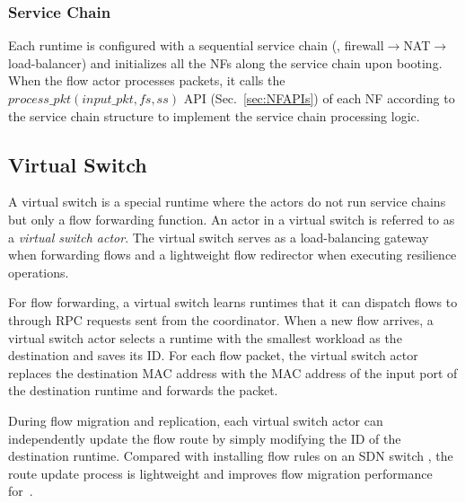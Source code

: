 \subsubsection{Service Chain}
\label{sec:rtsc}

Each runtime is configured with a sequential service chain (\eg, firewall$\rightarrow$NAT$\rightarrow$load-balancer) and initializes all the NFs along the service chain upon booting. When the flow actor processes packets, it calls the $process\_pkt(input\_pkt, fs, ss)$ API (Sec.~\ref{sec:NFAPIs}) of each NF according to the service chain structure to implement the service chain processing logic.


\subsection{Virtual Switch}
\label{sec:virtualswitch}

A virtual switch is a special runtime where the actors do not run service chains but only a flow forwarding function. An actor in a virtual switch is referred to as a {\em virtual switch actor}. The virtual switch serves as a load-balancing gateway when forwarding flows and a lightweight flow redirector when executing resilience operations.

For flow forwarding, a virtual switch learns runtimes that it can dispatch flows to through RPC requests sent from the coordinator. When a new flow arrives, a virtual switch actor selects a runtime with the smallest workload as the destination and saves its ID. For each flow packet, the virtual switch actor replaces the destination MAC address with the MAC address of the input port of the destination runtime and forwards the packet. %

During flow migration and replication, each virtual switch actor can independently update the flow route by simply modifying the ID of the destination runtime. Compared with installing flow rules on an SDN switch \cite{rajagopalan2013split, gember2015opennf}, the route update process is lightweight and improves flow migration performance for~\nfactor.

